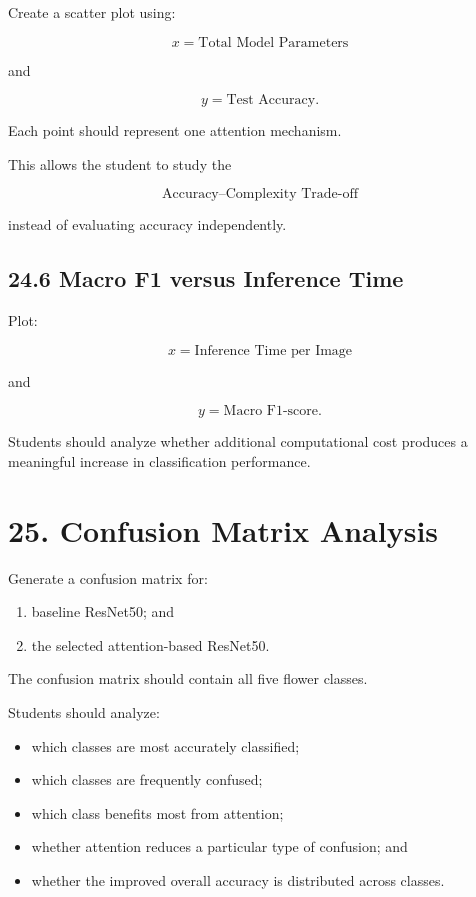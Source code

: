 \documentclass[10pt]{article}
\begin{document}
Create a scatter plot using:

\[
x=
\text{Total Model Parameters}
\]

and

\[
y=
\text{Test Accuracy}.
\]

Each point should represent one attention mechanism.

This allows the student to study the

\[
\boxed{
\text{Accuracy--Complexity Trade-off}
}
\]

instead of evaluating accuracy independently.

\subsection*{24.6 Macro F1 versus Inference Time}

Plot:

\[
x=
\text{Inference Time per Image}
\]

and

\[
y=
\text{Macro F1-score}.
\]

Students should analyze whether additional computational cost produces a
meaningful increase in classification performance.

\section*{25. Confusion Matrix Analysis}

Generate a confusion matrix for:

\begin{enumerate}

\item baseline ResNet50; and

\item the selected attention-based ResNet50.

\end{enumerate}

The confusion matrix should contain all five flower classes.

Students should analyze:

\begin{itemize}

\item which classes are most accurately classified;

\item which classes are frequently confused;

\item which class benefits most from attention;

\item whether attention reduces a particular type of confusion; and

\item whether the improved overall accuracy is distributed across classes.

\end{itemize}
\end{document}
